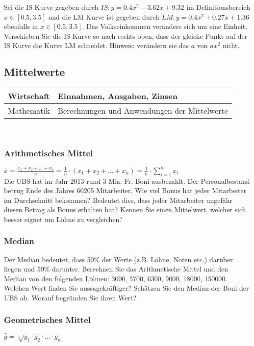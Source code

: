 \documentclass[11pt, twocolumn, a4paper]{scrartcl}
\begin{document}
Sei die IS Kurve gegeben durch $IS: y = 0.4x^{2} - 3.62x + 9.32$ im Definitionsbereich $x \in [0.5, 3.5]$ und die LM Kurve ist gegeben durch $LM: y = 0.4x^{2} + 0.27x + 1.36$ ebenfalls in  $x \in [0.5, 3.5].$ Das Volkseinkommen verändere sich um eine Einheit. Verschieben Sie die IS Kurve so nach rechts oben, dass der gleiche Punkt auf der IS Kurve die Kurve LM schneidet. Hinweis: verändern sie das $a$ von $ax^{2}$ nicht.

\subsection{Mittelwerte}



\begin{tabular}{l l}
\toprule
Wirtschaft & Einnahmen, Ausgaben, Zinsen \\
\midrule
Mathematik& Berechnungen und Anwendungen der Mittelwerte \\

\bottomrule
\end{tabular}\\

\subsubsection{Arithmetisches Mittel}
$\bar{x}=\frac{x_1 + x_2 + \dots + x_n}{n}=\frac{1}{n} \cdot (x_1 + x_2 + \dots + x_n)=\frac{1}{n}\cdot \sum\limits_{i=1}^n x_i$\\

Die UBS hat im Jahr 2013 rund 3 Mia. Fr. Boni ausbezahlt. Der Personalbestand betrug Ende des Jahres 60205 Mitarbeiter. Wie viel Bonus hat jeder Mitarbeiter im Durchschnitt bekommen? Bedeutet dies, dass jeder Mitarbeiter ungefähr diesen Betrag als Bonus erhalten hat? Kennen Sie einen Mittelwert, welcher sich besser eignet um Löhne zu vergleichen?

\subsubsection{Median}
Der Median bedeutet, dass 50\% der Werte (z.B. Löhne, Noten etc.) darüber liegen und 50\% darunter. Berechnen Sie das Arithmetische Mittel und den Median von den folgenden Löhnen: 3000, 5700, 6300, 9000, 18000, 150000. Welchen Wert finden Sie aussagekräftiger? Schätzen Sie den Median der Boni der UBS ab. Worauf begründen Sie ihren Wert?

\subsubsection{Geometrisches Mittel}
$\hat{g}=\sqrt[n]{g_1 \cdot g_2 \cdot \ldots \cdot g_n}$\\
\end{document}
